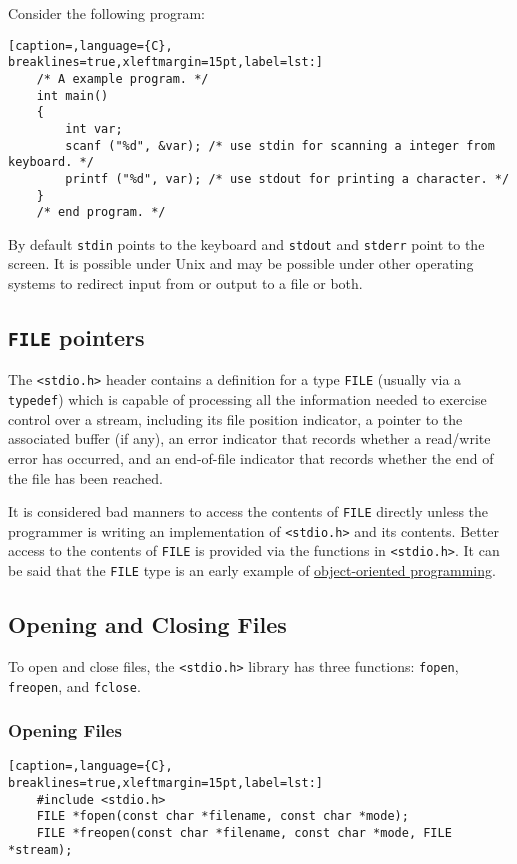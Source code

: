 Consider the following program:

\lstset{basicstyle=\scriptsize, numbers=left, captionpos=b, tabsize=4}
\begin{lstlisting}[caption=,language={C},
breaklines=true,xleftmargin=15pt,label=lst:]
	/* A example program. */
	int main()
	{
	    int var;
	    scanf ("%d", &var); /* use stdin for scanning a integer from keyboard. */
	    printf ("%d", var); /* use stdout for printing a character. */
	}
	/* end program. */
\end{lstlisting}

By default \texttt{stdin} points to the keyboard and \texttt{stdout} and
\texttt{stderr} point to the screen. It is possible under Unix and may be
possible under other operating systems to redirect input from or output to a
file or both.

\subsection{\texttt{FILE} pointers}
The \texttt{\textless{}stdio.h\textgreater{}} header contains a definition for
a type \texttt{FILE} (usually via a \texttt{typedef}) which is capable of
processing all the information needed to exercise control over a stream,
including its file position indicator, a pointer to the associated buffer (if
any), an error indicator that records whether a read/write error has occurred,
and an end-of-file indicator that records whether the end of the file has been
reached.

It is considered bad manners to access the contents of \texttt{FILE} directly
unless the programmer is writing an implementation of
\texttt{\textless{}stdio.h\textgreater{}} and its contents. Better access to
the contents of \texttt{FILE} is provided via the functions in
\texttt{\textless{}stdio.h\textgreater{}}. It can be said that the
\texttt{FILE} type is an early example of
\href{http://en.wikipedia.org/wiki/Object-oriented\_programming}{object-oriented
programming}.

\subsection{Opening and Closing Files}
To open and close files, the \texttt{\textless{}stdio.h\textgreater{}} library
has three functions: \texttt{fopen}, \texttt{freopen}, and \texttt{fclose}.
\subsubsection{Opening Files}
\lstset{basicstyle=\scriptsize, numbers=left, captionpos=b, tabsize=4}
\begin{lstlisting}[caption=,language={C},
breaklines=true,xleftmargin=15pt,label=lst:]
	#include <stdio.h>
	FILE *fopen(const char *filename, const char *mode);
	FILE *freopen(const char *filename, const char *mode, FILE *stream);
\end{lstlisting}

